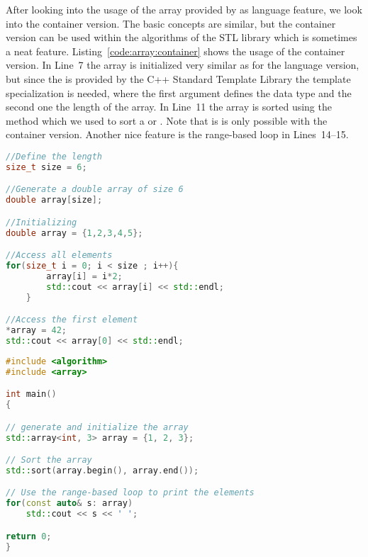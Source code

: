 After looking into the usage of the array provided by as language feature, we look into the container version. The basic concepts are similar, but the container version can be used within the algorithms of the STL library which is sometimes a neat feature. Listing~\ref{code:array:container} shows the usage of the container version. In Line~7 the array is initialized very similar as for the language version, but since the  is provided by the C++ Standard Template Library the template specialization  is needed, where the first argument defines the data type and the second one the length of the array. In Line~11 the array is sorted using the  method which we used to sort a  or . Note that is is only possible with the container version. Another nice feature is the range-based  loop in Lines~14--15.


\begin{lstlisting}[language=C++,caption={Usage of arrays using the language keyword.\label{code:array:language}},float,floatplacement=tb]
//Define the length
size_t size = 6;

//Generate a double array of size 6
double array[size];

//Initializing 
double array = {1,2,3,4,5};

//Access all elements
for(size_t i = 0; i < size ; i++){
        array[i] = i*2;
        std::cout << array[i] << std::endl;
    }

//Access the first element
*array = 42;
std::cout << array[0] << std::endl;

\end{lstlisting}

\begin{lstlisting}[language=C++,caption={Usage of arrays as containers.\label{code:array:container}},float,floatplacement=tb]
#include <algorithm>
#include <array>

int main()
{

// generate and initialize the array
std::array<int, 3> array = {1, 2, 3};

// Sort the array
std::sort(array.begin(), array.end());

// Use the range-based loop to print the elements
for(const auto& s: array)
	std::cout << s << ' ';

return 0;
}
\end{lstlisting}







